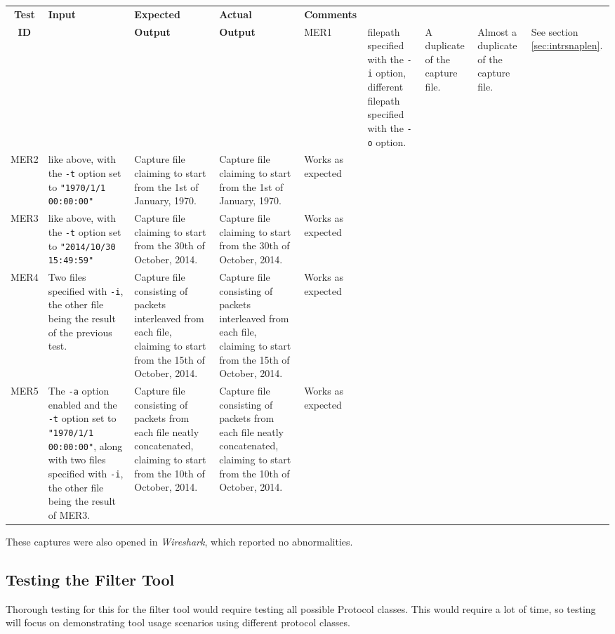 \documentclass[10pt,a4paper,notitlepage]{report}
\begin{document}
\begin{tabularx}{\textwidth}{|c|X|X|X|X|}
\hline
\textbf{Test} & \textbf{Input} & \textbf{Expected} & \textbf{Actual} & \textbf{Comments}\\
\textbf{ID} & & \textbf{Output} & \textbf{Output} &
\endhead
\hline
MER1 & filepath specified with the \texttt{-i} option, different filepath specified with the \texttt{-o} option. &
	A duplicate of the capture file. &
	Almost a duplicate of the capture file. &
	See section \ref{sec:intrsnaplen}. \\ \hline
MER2 & like above, with the \texttt{-t} option set to \texttt{"1970/1/1 00:00:00"} &
	Capture file claiming to start from the 1st of January, 1970. &
	Capture file claiming to start from the 1st of January, 1970. &
	Works as expected \\ \hline
MER3 & like above, with the \texttt{-t} option set to \texttt{"2014/10/30 15:49:59"} &
	Capture file claiming to start from the 30th of October, 2014. &
	Capture file claiming to start from the 30th of October, 2014. &
	Works as expected \\ \hline
MER4 & Two files specified with \texttt{-i}, the other file being the result of the previous test. &
	Capture file consisting of packets interleaved from each file, claiming to start from the 15th of October, 2014. &
	Capture file consisting of packets interleaved from each file, claiming to start from the 15th of October, 2014. &
	Works as expected \\ \hline
MER5 & The \texttt{-a} option enabled and the \texttt{-t} option set to \texttt{"1970/1/1 00:00:00"}, along with two files specified with \texttt{-i}, the other file being the result of MER3. &
	Capture file consisting of packets from each file neatly concatenated, claiming to start from the 10th of October, 2014. &
	Capture file consisting of packets from each file neatly concatenated, claiming to start from the 10th of October, 2014. &
	Works as expected \\ \hline
\end{tabularx}

These captures were also opened in \emph{Wireshark}, which reported no abnormalities.

\subsection{Testing the Filter Tool}
Thorough testing for this for the filter tool would require testing all possible Protocol classes. This would require a lot of time, so testing will focus on demonstrating tool usage scenarios using different protocol classes.
\end{document}
